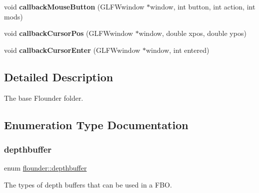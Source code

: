 \begin{DoxyCompactItemize}
\item 
\mbox{\label{namespaceflounder_a3914861bc871e4d237b5878fde9bcbbd}} 
void {\bfseries callback\+Mouse\+Button} (G\+L\+F\+Wwindow $\ast$window, int button, int action, int mods)
\item 
\mbox{\label{namespaceflounder_a84f436b17b1e87b7e8ff691b9ab0bb09}} 
void {\bfseries callback\+Cursor\+Pos} (G\+L\+F\+Wwindow $\ast$window, double xpos, double ypos)
\item 
\mbox{\label{namespaceflounder_ab637dcebaebff142804649b9136870d8}} 
void {\bfseries callback\+Cursor\+Enter} (G\+L\+F\+Wwindow $\ast$window, int entered)
\end{DoxyCompactItemize}


\subsection{Detailed Description}
The base Flounder folder. 



\subsection{Enumeration Type Documentation}
\mbox{\label{namespaceflounder_aed09c736167e783c910ec9e58479b57c}} 
\subsubsection{\texorpdfstring{depthbuffer}{depthbuffer}}
{\footnotesize\ttfamily enum \hyperlink{namespaceflounder_aed09c736167e783c910ec9e58479b57c}{flounder\+::depthbuffer}}



The types of depth buffers that can be used in a F\+BO. 

